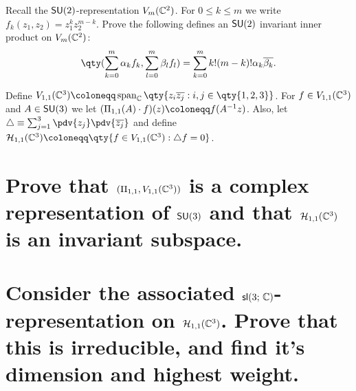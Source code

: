 \documentclass[
	pages,
	boxes,
	color=WildStrawberry
]{homework}
\theoremstyle{plain}
\begin{document}
\begin{problem}
Recall the $\mathsf{SU}(2)$-representation $V_m(\mathbb{C}^2)$. For $0\leq k \leq m$ we write $f_k(z_1, z_2) = z_1^k z_2^{m - k}$. Prove the following defines an $\mathsf{SU}(2)$ invariant inner product on $V_m(\mathbb{C}^2)$:
\begin{equation*}
	\qty(\sum_{k = 0}^m \alpha_k f_k, \sum_{l = 0}^m\beta_l f_l) = \sum_{k = 0}^m k!(m - k)!\alpha_k\overline{\beta_k}.
\end{equation*}
\end{problem}

\begin{solution}

\end{solution}

\begin{problem}
Define $V_{1, 1}(\C^3)\defeq \vspan_\C\qty{z_i\overline{z_j} : i, j\in\qty{1,2,3}}$. For $f\in V_{1,1}(\mathbb{C}^3)$ and $A\in \mathsf{SU}(3)$ we let $(\Pi_{1,1}(A)\cdot f)(z)\defeq f(A^{-1}z)$. Also, let $\laplace \equiv \sum_{j = 1}^3 \pdv{z_j}\pdv{\overline{z_j}}$ and define $\mathcal{H}_{1,1}(\C^3)\defeq \qty{f\in V_{1, 1}(\C^3) : \laplace{f} = 0}$.
\begin{parts}
	\part{Prove that $(\Pi_{1,1}, V_{1,1}(\mathbb{C}^3))$ is a complex representation of $\mathsf{SU}(3)$ and that $\mathcal{H}_{1,1}(\mathbb{C}^3)$ is an invariant subspace.}\label{part:4a}
	\part{Consider the associated $\mathsf{sl}(3;\, \mathbb{C})$-representation on $\mathcal{H}_{1,1}(\mathbb{C}^3)$. Prove that this is irreducible, and find it's dimension and highest weight.}\label{part:4b}
\end{parts}
\end{problem}
\end{document}
